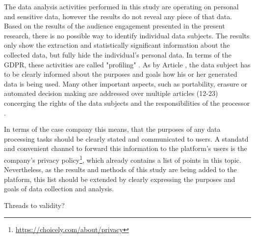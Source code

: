 The data analysis activities performed in this study are operating on personal and sensitive data, however the results do not reveal any piece of that data. Based on the results of the audience engagement presented in the present research, there is no possible way to identify individual data subjects. The results only show the extraction and statistically significant information about the collected data, but fully hide the individual's personal data. In terms of the GDPR, these activities are called "profiling" \cite{gdpr}. As by Article \cite{gdpr}, the data subject has to be clearly informed about the purposes and goals how his or her generated data is being used. Many other important aspects, such as portability, erasure or automated decision making are addressed over multiple articles (12-23) concerging the rights of the data subjects and the responsibilities of the processor \cite{gdpr}.

In terms of the case company this means, that the purposes of any data processing tasks should be clearly stated and communicated to users. A standatd and convenient channel to forward this information to the platform's users is the company's privacy policy\footnote{\url{https://choicely.com/about/privacy}}, which already contains a list of points in this topic. Nevertheless, as the results and methods of this study are being added to the platform, this list should be extended by clearly expressing the purposes and goals of data collection and analysis.

Threads to validity? 

